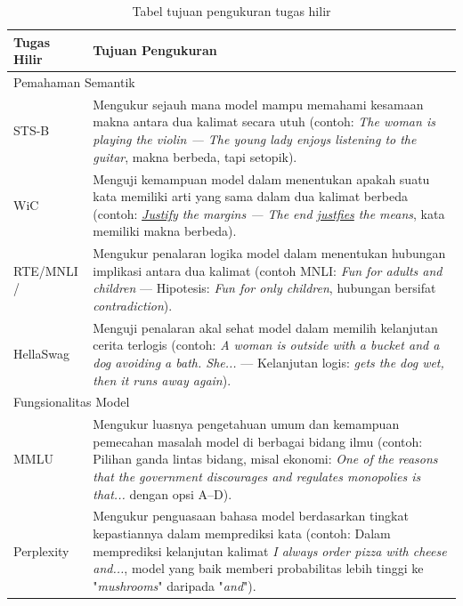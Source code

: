 \begin{table}[h]
    \centering
	\caption{Tabel tujuan pengukuran tugas hilir}
\label{tab:sl_downstream}
\begin{tabularx}{\textwidth}{ p{4cm} | X }
	\hline
	\textbf{Tugas Hilir} & \textbf{Tujuan Pengukuran}  \\
	\hline
	\multicolumn{2}{l}{Pemahaman Semantik} \\
	\hline
	STS-B \newline \autocite{Cer_2017}& Mengukur sejauh mana model mampu memahami kesamaan makna antara dua kalimat secara utuh (contoh: \textit{The woman is playing the violin — The young lady enjoys listening to the guitar}, makna berbeda, tapi setopik). \\
	WiC \newline \autocite{pilehvar-camacho-collados-2019-wic} & Menguji kemampuan model dalam menentukan apakah suatu kata memiliki arti yang sama dalam dua kalimat berbeda (contoh: \textit{\underline{Justify} the margins — The end \underline{justfies} the means}, kata memiliki makna berbeda).\\
	RTE/MNLI \newline \autocite{dagan2006pascal}/\autocite{williams-etal-2018-broad} & Mengukur penalaran logika model dalam menentukan hubungan implikasi antara dua kalimat (contoh MNLI: \textit{Fun for adults and children} --- Hipotesis: \textit{Fun for only children}, hubungan bersifat \textit{contradiction}).\\
	HellaSwag \newline \autocite{zellers-etal-2019-hellaswag} & Menguji penalaran akal sehat model dalam memilih kelanjutan cerita terlogis (contoh: \textit{A woman is outside with a bucket and a dog avoiding a bath. She...} --- Kelanjutan logis: \textit{gets the dog wet, then it runs away again}).\\
    \hline
	\multicolumn{2}{l}{Fungsionalitas Model} \\
	\hline
	MMLU \newline \autocite{hendrycks2021mmlu} & Mengukur luasnya pengetahuan umum dan kemampuan pemecahan masalah model di berbagai bidang ilmu (contoh: Pilihan ganda lintas bidang, misal ekonomi: \textit{One of the reasons that the government discourages and regulates monopolies is that...} dengan opsi A--D). \\
	Perplexity \newline \autocite{jurafsky2023speech} & Mengukur penguasaan bahasa model berdasarkan tingkat kepastiannya dalam memprediksi kata (contoh: Dalam memprediksi kelanjutan kalimat \textit{I always order pizza with cheese and...}, model yang baik memberi probabilitas lebih tinggi ke "\textit{mushrooms}" daripada "\textit{and}").\\
	\hline
\end{tabularx}
\end{table}